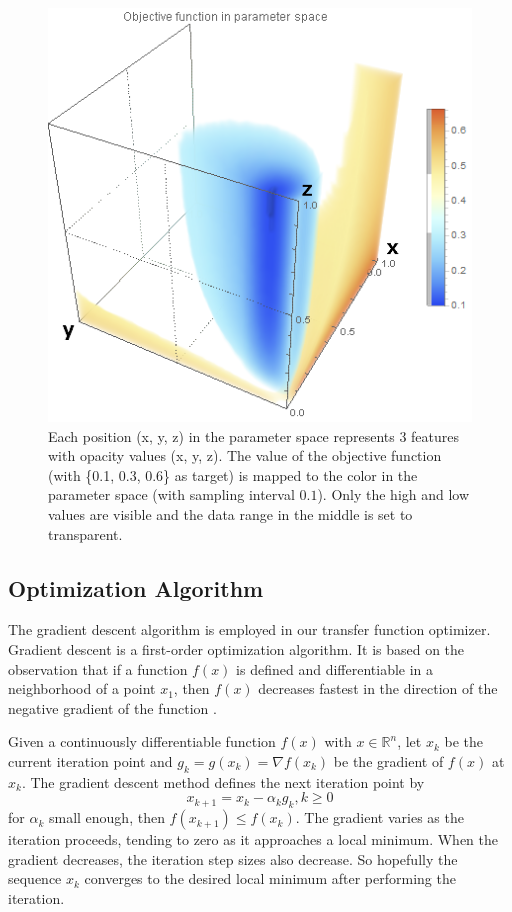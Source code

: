 \begin{figure}
	\centering
	\begin{minipage}{.6\textwidth}
		\includegraphics[width=1\linewidth]{images/nucleon_strong_red_parameterspace}
	\end{minipage}
	\caption{Each position (x, y, z) in the parameter space represents 3 features with opacity values (x, y, z). The value of the objective function (with \{0.1, 0.3, 0.6\} as target) is mapped to the color in the parameter space (with sampling interval $ 0.1 $). Only the high and low values are visible and the data range in the middle is set to transparent.}
	\label{fig:nucleon_parameterspace}
\end{figure}

\subsection{Optimization Algorithm}
The gradient descent algorithm is employed in our transfer function optimizer.
Gradient descent is a first-order optimization algorithm. It is based on the observation that if a function $ f(x) $ is defined and differentiable in a neighborhood of a point $ x_{1} $, then $ f(x) $ decreases fastest in the direction of the negative gradient of the function \cite{chong_introduction_2013}.

Given a continuously differentiable function $ f(x) $ with $ x \in \mathbb{R}^{n} $, let $ x_{k} $ be the current iteration point and $ g_{k}=g(x_{k})= \nabla f(x_{k}) $ be the gradient of $ f(x) $ at $ x_{k} $. The gradient descent method defines the next iteration point by
\[ x_{k+1}=x_{k}- \alpha_{k} g_{k} , k \geq 0 \]
for $ \alpha_{k} $ small enough, then $ f(x_{k+1}) \leq f(x_{k}) $. The gradient varies as the iteration proceeds, tending to zero as it approaches a local minimum. When the gradient decreases, the iteration step sizes also decrease. So hopefully the sequence $ {x_{k}} $ converges to the desired local minimum after performing the iteration.

